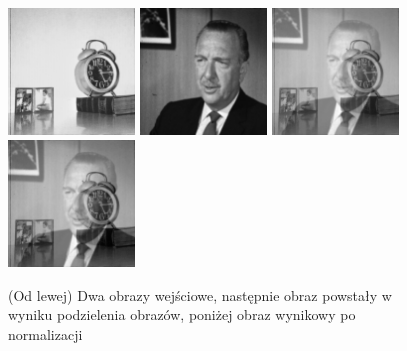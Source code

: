 \documentclass[final,a4paper,openany,12pt]{mwbk}
\begin{document}
\begin{figure}[H]
	\begin{center}
		\includegraphics[width=0.3\textwidth]{1/1Gray_Img1_Div_Original}
		\includegraphics[width=0.3\textwidth]{1/1Gray_Img2_Div_Original}
		\includegraphics[width=0.3\textwidth]{1/1Gray_Img_Div_Result}
		\includegraphics[width=0.3\textwidth]{1/1Gray_Img_Div_Result_Norm}
	\end{center}
	\caption{(Od lewej) Dwa obrazy wejściowe, następnie obraz powstały w wyniku podzielenia obrazów, poniżej obraz wynikowy po normalizacji }
\end{figure}
\end{document}

